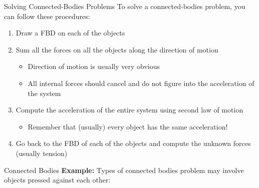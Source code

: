 \documentclass[12pt,compress,aspectratio=169]{beamer}
\newcommand{\mb}[1]{\ensuremath\mathbf{#1}}
\begin{document}
\begin{frame}{Solving Connected-Bodies Problems}
  To solve a connected-bodies problem, you can follow these procedures:
  \begin{enumerate}
  \item Draw a FBD on each of the objects
  \item Sum all the forces on all the objects along the direction of motion
    \begin{itemize}
    \item Direction of motion is usually very obvious
    \item All internal forces should cancel and do not figure into the
      acceleration of the system
    \end{itemize}
  \item Compute the acceleration of the entire system using second law of motion
    \begin{itemize}
    \item Remember that (usually) every object has the same acceleration!
    \end{itemize}
  \item Go back to the FBD of each of the objects and compute the unknown
    forces (usually tension)
  \end{enumerate}
\end{frame}






\begin{frame}{Connected Bodies}
  \textbf{Example:} Types of connected bodies problem may involve objects
  pressed against each other:
  \begin{center}
  \end{center}
\end{frame}
\end{document}
